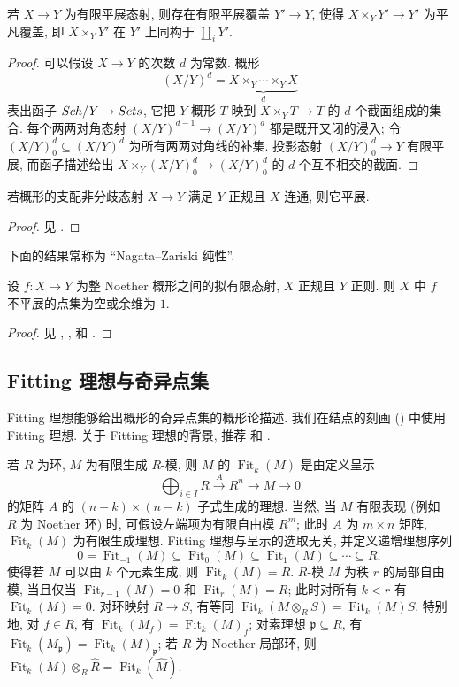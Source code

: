 \begin{proposition}\label{src:A.3.11}
若 $X\to Y$ 为有限平展态射, 则存在有限平展覆盖 $Y'\to Y$, 使得 $X\times_Y Y'\to Y'$ 为平凡覆盖, 即 $X\times_Y Y'$ 在 $Y'$ 上同构于 $\coprod_i Y'$.
\end{proposition}
\begin{proof}
可以假设 $X\to Y$ 的次数 $d$ 为常数. 概形
\[
(X/Y)^d=\underbrace{X\times_Y\cdots\times_Y X}_{d}
\]
表出函子 $Sch/Y\to Sets$, 它把 $Y$-概形 $T$ 映到 $X\times_Y T\to T$ 的 $d$ 个截面组成的集合. 每个两两对角态射 $(X/Y)^{d-1}\to(X/Y)^d$ 都是既开又闭的浸入; 令 $(X/Y)^d_0\subseteq(X/Y)^d$ 为所有两两对角线的补集. 投影态射 $(X/Y)^d_0\to Y$ 有限平展, 而函子描述给出 $X\times_Y(X/Y)^d_0\to(X/Y)^d_0$ 的 $d$ 个互不相交的截面.
\end{proof}
\begin{proposition}\label{src:A.3.12}
若概形的支配非分歧态射 $X\to Y$ 满足 $Y$ 正规且 $X$ 连通, 则它平展.
\end{proposition}
\begin{proof}
见 \cite[推论 I.$9.11$]{SGA1}.
\end{proof}
下面的结果常称为 ``Nagata--Zariski 纯性''.
\begin{proposition}[分支点集的纯性]\label{src:A.3.13}
设 $f:X\to Y$ 为整 Noether 概形之间的拟有限态射, $X$ 正规且 $Y$ 正则. 则 $X$ 中 $f$ 不平展的点集为空或余维为 $1$.
\end{proposition}
\begin{proof}
见 \cite{Zar58}, \cite{Nag59}, \cite[定理 X.$3.1$]{SGA1} 和 \cite[Tag 0BMB]{SP}.
\end{proof}

\subsection{Fitting 理想与奇异点集}\label{src:A.3.4-subsection}
Fitting 理想能够给出概形的奇异点集的概形论描述. 我们在结点的刻画 () 中使用 Fitting 理想. 关于 Fitting 理想的背景, 推荐 \cite[Tag 07Z6]{SP} 和 \cite[\S$20$]{Eis95}.

若 $R$ 为环, $M$ 为有限生成 $R$-模, 则 $M$ 的 $\operatorname{Fit}_k(M)$ 是由定义呈示
\[
\bigoplus_{i\in I}R\xrightarrow{A}R^n\longrightarrow M\longrightarrow0
\]
的矩阵 $A$ 的 $(n-k)\times(n-k)$ 子式生成的理想. 当然, 当 $M$ 有限表现 (例如 $R$ 为 Noether 环) 时, 可假设左端项为有限自由模 $R^m$; 此时 $A$ 为 $m\times n$ 矩阵, $\operatorname{Fit}_k(M)$ 为有限生成理想. Fitting 理想与呈示的选取无关, 并定义递增理想序列
\[
0=\operatorname{Fit}_{-1}(M)\subseteq\operatorname{Fit}_0(M)\subseteq\operatorname{Fit}_1(M)\subseteq\cdots\subseteq R,
\]
使得若 $M$ 可以由 $k$ 个元素生成, 则 $\operatorname{Fit}_k(M)=R$. $R$-模 $M$ 为秩 $r$ 的局部自由模, 当且仅当 $\operatorname{Fit}_{r-1}(M)=0$ 和 $\operatorname{Fit}_r(M)=R$; 此时对所有 $k<r$ 有 $\operatorname{Fit}_k(M)=0$. 对环映射 $R\to S$, 有等同 $\operatorname{Fit}_k(M\otimes_R S)=\operatorname{Fit}_k(M)S$. 特别地, 对 $f\in R$, 有 $\operatorname{Fit}_k(M_f)=\operatorname{Fit}_k(M)_f$; 对素理想 $\mathfrak p\subseteq R$, 有 $\operatorname{Fit}_k(M_{\mathfrak p})=\operatorname{Fit}_k(M)_{\mathfrak p}$; 若 $R$ 为 Noether 局部环, 则 $\operatorname{Fit}_k(M)\otimes_R\widehat R=\operatorname{Fit}_k(\widehat M)$.

